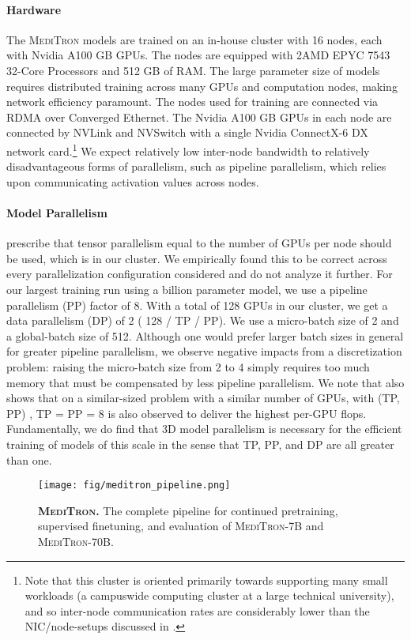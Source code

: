 \documentclass{article}
\newcommand{\mtron}{\textsc{MediTron}\xspace}
\newcommand{\mtrona}{\textsc{MediTron-7B}\xspace}
\newcommand{\mtronb}{\textsc{MediTron-70B}\xspace}
\begin{document}
\paragraph{Hardware}
The \mtron models are trained on an in-house cluster with 16 nodes, each with  Nvidia A100 GB GPUs. The nodes are equipped with 2AMD EPYC 7543 32-Core Processors and 512 GB of RAM. The large parameter size of models requires distributed training across many GPUs and computation nodes, making network efficiency paramount. The  nodes used for training are connected via RDMA over Converged Ethernet. The  Nvidia A100 GB GPUs in each node are connected by NVLink and NVSwitch with a single Nvidia ConnectX-6 DX network card.\footnote{Note that this cluster is oriented primarily towards supporting many small workloads (a campuswide computing cluster at a large technical university), and so inter-node communication rates are considerably lower than the  NIC/node-setups discussed in \citep{Korthikanti2022}.} We expect relatively low inter-node bandwidth to relatively disadvantageous forms of parallelism, such as pipeline parallelism, which relies upon communicating activation values across nodes.

\paragraph{Model Parallelism}

\citet{Narayanan2021} prescribe that tensor parallelism equal to the number of GPUs per node should be used, which is  in our cluster. We empirically found this to be correct across every parallelization configuration considered and do not analyze it further. For our largest training run using a  billion parameter model, we use a pipeline parallelism (PP) factor of 8. With a total of 128 GPUs in our cluster, we get a data parallelism (DP) of 2 ( 128 / TP / PP). We use a micro-batch size of 2 and a global-batch size of 512. Although one would prefer larger batch sizes in general for greater pipeline parallelism, we observe negative impacts from a discretization problem: raising the micro-batch size from 2 to 4 simply requires too much memory that must be compensated by less pipeline parallelism. We note that \citet[Figure 13]{Narayanan2021} also shows that on a similar-sized problem with a similar number of GPUs, with (TP, PP) , TP = PP = 8 is also observed to deliver the highest per-GPU flops. Fundamentally, we do find that 3D model parallelism is necessary for the efficient training of models of this scale in the sense that TP, PP, and DP are all greater than one. \begin{figure}[t]
    \centering
    \texttt{[image: fig/meditron\_pipeline.png]}
    \caption{\textbf{\mtron.} The complete pipeline for continued pretraining, supervised finetuning, and evaluation of \mtrona and \mtronb. }
    \label{fig:enter-label}
\end{figure}
\end{document}
